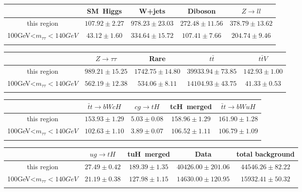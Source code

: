 \centering
\begin{tabular}{ccccc} \toprule\toprule
 & SM~Higgs & W+jets & Diboson & $Z\to ll$\\\midrule
this region & $107.92\pm2.27$ & $978.23\pm23.03$ & $272.48\pm11.56$ & $378.79\pm13.62$\\
100GeV<$m_{\tau\tau}<140GeV$ & $43.12\pm1.60$ & $334.64\pm15.72$ & $107.41\pm7.66$ & $204.74\pm9.46$\\
\bottomrule\bottomrule\\
\end{tabular}
\begin{tabular}{ccccc} \toprule\toprule
 & $Z\to \tau\tau$ & Rare & $t\bar{t}$ & $t\bar{t}V$\\\midrule
this region & $989.21\pm15.25$ & $1742.75\pm14.80$ & $39933.94\pm73.85$ & $142.93\pm1.00$\\
100GeV<$m_{\tau\tau}<140GeV$ & $562.19\pm12.38$ & $534.06\pm8.11$ & $14104.93\pm43.75$ & $41.33\pm0.53$\\
\bottomrule\bottomrule\\
\end{tabular}
\begin{tabular}{ccccc} \toprule\toprule
 & $\bar{t}t\to bWcH$ & $cg\to tH$ & tcH~merged & $\bar{t}t\to bWuH$\\\midrule
this region & $153.93\pm1.29$ & $5.03\pm0.08$ & $158.96\pm1.29$ & $161.90\pm1.28$\\
100GeV<$m_{\tau\tau}<140GeV$ & $102.63\pm1.10$ & $3.89\pm0.07$ & $106.52\pm1.11$ & $106.79\pm1.09$\\
\bottomrule\bottomrule\\
\end{tabular}
\begin{tabular}{ccccc} \toprule\toprule
 & $ug\to tH$ & tuH~merged & Data & total background\\\midrule
this region & $27.49\pm0.42$ & $189.39\pm1.35$ & $40426.00\pm201.06$ & $44546.26\pm82.22$\\
100GeV<$m_{\tau\tau}<140GeV$ & $21.19\pm0.38$ & $127.98\pm1.15$ & $14630.00\pm120.95$ & $15932.41\pm50.32$\\
\bottomrule\bottomrule\\
\end{tabular}
